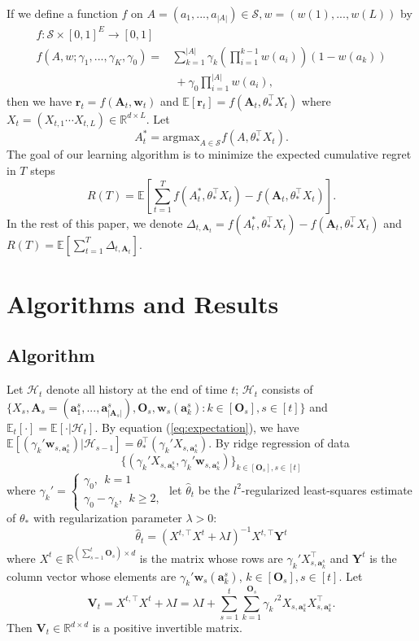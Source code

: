 \documentclass{article}
\newcommand{\EE}{\mathbb{E}}
\newcommand{\RR}{\mathbb{R}}
\newcommand{\bA}{\mathbf{A}}
\newcommand{\ba}{\mathbf{a}}
\newcommand{\bO}{\mathbf{O}}
\newcommand{\br}{\mathbf{r}}
\newcommand{\bV}{\mathbf{V}}
\newcommand{\bw}{\mathbf{w}}
\newcommand{\bY}{\mathbf{Y}}
\newcommand{\cH}{\mathcal{H}}
\newcommand{\cS}{\mathcal{S}}
\newcommand{\argmax}{\mathrm{argmax}}
\newcommand{\abs}[1]{\left| #1 \right|}
\begin{document}
If we define a function $f$ on $A=(a_1,...,a_{\abs{A}}) \in \cS, w=(w(1),...,w(L))$ by
\begin{align*}
f : \cS \times [0,1]^E \to [0,1]&~\\
f(A,w;\gamma_1,...,\gamma_K,\gamma_0) =& \sum_{k=1}^{\abs{A}}\gamma_k (\prod_{i=1}^{k-1}w(a_i))(1 - w(a_k)) \\
\qquad \qquad &~+ \gamma_0 \prod_{i=1}^{\abs{A}}w(a_i),
\end{align*}
then we have $\br_t = f(\bA_t, \bw_t)$ and $\EE[\br_t]=f(\bA_t,\theta_*^{\top}X_t)$ where $X_t=(X_{t,1} \cdots X_{t,L})\in\RR^{d\times L}$. Let 
$$
A_t^* = \argmax_{A\in \cS} f(A,\theta_*^{\top}X_t).
$$ 
The goal of our learning algorithm is to minimize the expected cumulative regret in $T$ steps
$$
R(T) = \EE[\sum_{t=1}^T f(A_t^*, \theta_*^{\top}X_t) - f(\bA_t, \theta_*^{\top}X_t)].
$$
In the rest of this paper, we denote $\Delta_{t,\bA_t} = f(A_t^*, \theta_*^{\top}X_t) - f(\bA_t, \theta_*^{\top}X_t)$ and $R(T) = \EE[\sum_{t=1}^T \Delta_{t,\bA_t}]$.

\section{Algorithms and Results}

\subsection{Algorithm}
	
Let $\cH_t$ denote all history at the end of time $t$; $\cH_t$ consists of $\{X_s, \bA_s=(\ba_{1}^s,...,\ba_{\abs{\bA_s}}^s), \bO_s, \bw_s(\ba_k^s): k \in[\bO_s], s\in[t] \}$ and $\EE_t[\cdot] = \EE[\cdot | \cH_t]$. By equation (\ref{eq:expectation}), we have $\EE[(\gamma_k'\bw_{s,\ba_k^s}) | \cH_{s-1}] = \theta_*^{\top} (\gamma_k' X_{s,\ba_k^s})$. By ridge regression of data 
$$
\{(\gamma_k' X_{s,\ba_k^s}, \gamma_k'\bw_{s,\ba_k^s})\}_{k \in[\bO_s], s\in[t]}
$$
where $\gamma_k' = \begin{cases}
\gamma_0, ~~k=1\\
\gamma_0-\gamma_k, ~~k\geq 2,
\end{cases}$
let $\hat{\theta}_t$ be the $l^2$-regularized least-squares estimate of $\theta_*$ with regularization parameter $\lambda > 0$:
\begin{equation}
\hat{\theta}_t = (X^{t,\top}X^{t} + \lambda I)^{-1} X^{t, \top} \bY^t
\end{equation}
where $X^t \in \RR^{(\sum_{s=1}^{t}\bO_s) \times d}$ is the matrix whose rows are $\gamma_k' X_{s,\ba_k^s}^{\top}$ and $\bY^t$ is the column vector whose elements are $\gamma_k' \bw_s(\ba_k^s)$, $k \in[\bO_s], s\in[t]$. Let
$$
\bV_t = X^{t,\top}X^{t} + \lambda I = \lambda I + \sum_{s=1}^{t} \sum_{k=1}^{\bO_s} \gamma_k'^2 X_{s,\ba_k^s}X_{s,\ba_k^s}^{\top}.
$$
Then $\bV_t \in \RR^{d \times d}$ is a positive invertible matrix.
\end{document}
